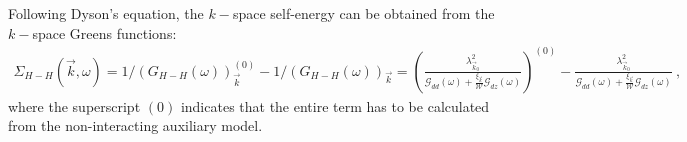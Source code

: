 \documentclass{report}
\numberwithin{equation}{section}
\begin{document}
Following Dyson's equation, the \(k-\)space self-energy can be obtained from the \(k-\)space Greens functions:
\begin{equation}\begin{aligned}
	\label{self-energy1}
	\Sigma_{H-H}(\vec k,\omega) = 1/\left(G_{H-H}(\omega)\right)_{\vec k}^{(0)} - 1/\left(G_{H-H}(\omega)\right)_{\vec k} = \left(\frac{\lambda_{\vec k_0}^2}{\mathcal{G}_{dd}(\omega) + \frac{\xi_{\vec k}}{\mathcal{W}}\mathcal{G}_{dz}(\omega)}\right)^{(0)} - \frac{\lambda_{\vec k_0}^2}{\mathcal{G}_{dd}(\omega) + \frac{\xi_{\vec k}}{\mathcal{W}}\mathcal{G}_{dz}(\omega)}~,
\end{aligned}\end{equation}
where the superscript \((0)\) indicates that the entire term has to be calculated from the non-interacting auxiliary model.
\end{document}
